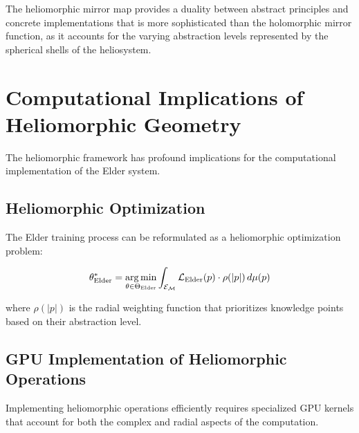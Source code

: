 The heliomorphic mirror map provides a duality between abstract principles and concrete implementations that is more sophisticated than the holomorphic mirror function, as it accounts for the varying abstraction levels represented by the spherical shells of the heliosystem.

\section{Computational Implications of Heliomorphic Geometry}

The heliomorphic framework has profound implications for the computational implementation of the Elder system.

\subsection{Heliomorphic Optimization}

The Elder training process can be reformulated as a heliomorphic optimization problem:

\begin{equation}
\theta_{\text{Elder}}^* = \mathop{\mathrm{arg\,min}}_{\theta \in \Theta_{\text{Elder}}} \int_{\mathcal{E}_{\mathcal{M}}} \mathcal{L}_{\text{Elder}}(p) \cdot \rho(|p|) \, d\mu(p)
\end{equation}

where $\rho(|p|)$ is the radial weighting function that prioritizes knowledge points based on their abstraction level.

\subsection{GPU Implementation of Heliomorphic Operations}

Implementing heliomorphic operations efficiently requires specialized GPU kernels that account for both the complex and radial aspects of the computation.


